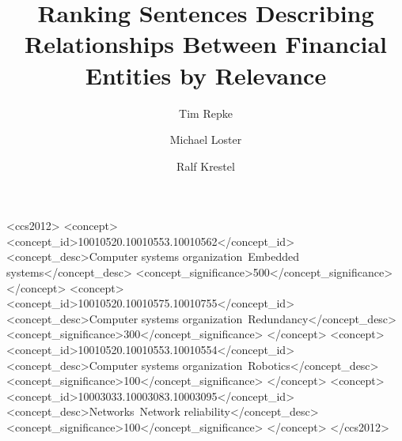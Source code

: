 \documentclass[
	format=sigconf,
	review=false]{acmart}
\title{Ranking Sentences Describing Relationships Between Financial Entities by Relevance}
\author{Tim Repke}
\affiliation{}
\author{Michael Loster}
\affiliation{%
	\institution{Hasso-Plattner-Institute}
	\city{Potsdam}
	\country{Germany}
}
\author{Ralf Krestel}
\begin{document}

%
%
\begin{CCSXML}
<ccs2012>
 <concept>
  <concept_id>10010520.10010553.10010562</concept_id>
  <concept_desc>Computer systems organization~Embedded systems</concept_desc>
  <concept_significance>500</concept_significance>
 </concept>
 <concept>
  <concept_id>10010520.10010575.10010755</concept_id>
  <concept_desc>Computer systems organization~Redundancy</concept_desc>
  <concept_significance>300</concept_significance>
 </concept>
 <concept>
  <concept_id>10010520.10010553.10010554</concept_id>
  <concept_desc>Computer systems organization~Robotics</concept_desc>
  <concept_significance>100</concept_significance>
 </concept>
 <concept>
  <concept_id>10003033.10003083.10003095</concept_id>
  <concept_desc>Networks~Network reliability</concept_desc>
  <concept_significance>100</concept_significance>
 </concept>
</ccs2012>  
\end{CCSXML}





\maketitle




 
\end{document}
